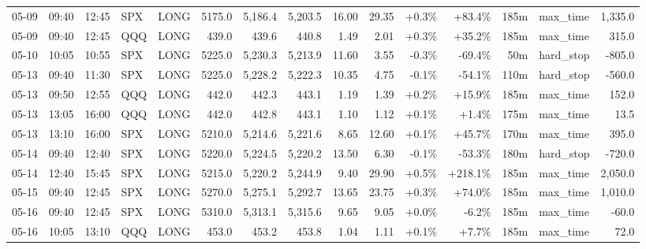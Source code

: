 \documentclass[11pt,a4paper,twoside]{article}
\begin{document}
\begin{landscape}
\begin{center}
\begin{longtable}{>{\color{txtmain}}l l l l l r r r r r r r r >{\color{txtmain}}l r}
05-09 & 09:40 & 12:45 & SPX & LONG & 5175.0 & 5,186.4 & 5,203.5 & 16.00 & 29.35 & \textcolor{wingreen}{+0.3\%} & \textcolor{wingreen}{+83.4\%} & 185m & max\_time & \textcolor{wingreen}{1,335.0} \\
05-09 & 09:40 & 12:45 & QQQ & LONG & 439.0 & 439.6 & 440.8 & 1.49 & 2.01 & \textcolor{wingreen}{+0.3\%} & \textcolor{wingreen}{+35.2\%} & 185m & max\_time & \textcolor{wingreen}{315.0} \\
05-10 & 10:05 & 10:55 & SPX & LONG & 5225.0 & 5,230.3 & 5,213.9 & 11.60 & 3.55 & \textcolor{lossred}{-0.3\%} & \textcolor{lossred}{-69.4\%} & 50m & hard\_stop & \textcolor{lossred}{-805.0} \\
05-13 & 09:40 & 11:30 & SPX & LONG & 5225.0 & 5,228.2 & 5,222.3 & 10.35 & 4.75 & \textcolor{lossred}{-0.1\%} & \textcolor{lossred}{-54.1\%} & 110m & hard\_stop & \textcolor{lossred}{-560.0} \\
05-13 & 09:50 & 12:55 & QQQ & LONG & 442.0 & 442.3 & 443.1 & 1.19 & 1.39 & \textcolor{wingreen}{+0.2\%} & \textcolor{wingreen}{+15.9\%} & 185m & max\_time & \textcolor{wingreen}{152.0} \\
05-13 & 13:05 & 16:00 & QQQ & LONG & 442.0 & 442.8 & 443.1 & 1.10 & 1.12 & \textcolor{wingreen}{+0.1\%} & \textcolor{wingreen}{+1.4\%} & 175m & max\_time & \textcolor{wingreen}{13.5} \\
05-13 & 13:10 & 16:00 & SPX & LONG & 5210.0 & 5,214.6 & 5,221.6 & 8.65 & 12.60 & \textcolor{wingreen}{+0.1\%} & \textcolor{wingreen}{+45.7\%} & 170m & max\_time & \textcolor{wingreen}{395.0} \\
05-14 & 09:40 & 12:40 & SPX & LONG & 5220.0 & 5,224.5 & 5,220.2 & 13.50 & 6.30 & \textcolor{lossred}{-0.1\%} & \textcolor{lossred}{-53.3\%} & 180m & hard\_stop & \textcolor{lossred}{-720.0} \\
05-14 & 12:40 & 15:45 & SPX & LONG & 5215.0 & 5,220.2 & 5,244.9 & 9.40 & 29.90 & \textcolor{wingreen}{+0.5\%} & \textcolor{wingreen}{+218.1\%} & 185m & max\_time & \textcolor{wingreen}{2,050.0} \\
05-15 & 09:40 & 12:45 & SPX & LONG & 5270.0 & 5,275.1 & 5,292.7 & 13.65 & 23.75 & \textcolor{wingreen}{+0.3\%} & \textcolor{wingreen}{+74.0\%} & 185m & max\_time & \textcolor{wingreen}{1,010.0} \\
05-16 & 09:40 & 12:45 & SPX & LONG & 5310.0 & 5,313.1 & 5,315.6 & 9.65 & 9.05 & \textcolor{wingreen}{+0.0\%} & \textcolor{lossred}{-6.2\%} & 185m & max\_time & \textcolor{lossred}{-60.0} \\
05-16 & 10:05 & 13:10 & QQQ & LONG & 453.0 & 453.2 & 453.8 & 1.04 & 1.11 & \textcolor{wingreen}{+0.1\%} & \textcolor{wingreen}{+7.7\%} & 185m & max\_time & \textcolor{wingreen}{72.0} \\

\end{longtable}
\end{center}
\end{landscape}
\end{document}
